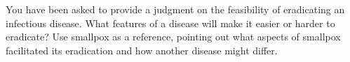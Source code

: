 You have been asked to provide a judgment on the feasibility of eradicating an infectious disease.  What features of a disease will make it easier or harder to eradicate?  Use smallpox as a reference, pointing out what aspects of smallpox facilitated its eradication and how another disease might differ. 

\TextEntry[itemname=dtk101]